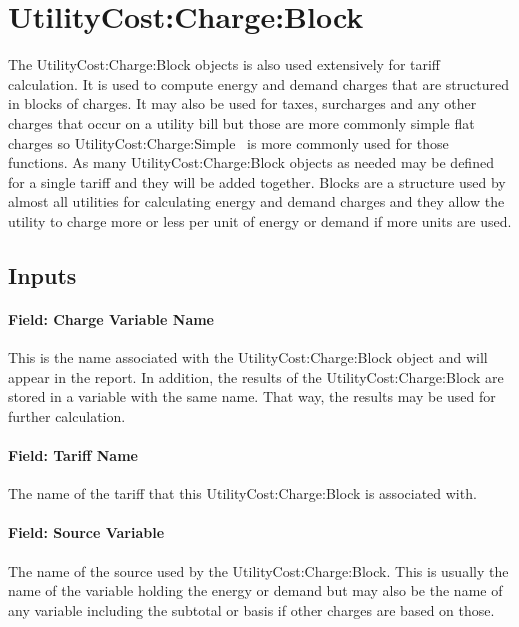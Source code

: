 \section{UtilityCost:Charge:Block}\label{utilitycostchargeblock}

The UtilityCost:Charge:Block objects is also used extensively for tariff calculation. It is used to compute energy and demand charges that are structured in blocks of charges. It may also be used for taxes, surcharges and any other charges that occur on a utility bill but those are more commonly simple flat charges so UtilityCost:Charge:Simple ~is more commonly used for those functions. As many UtilityCost:Charge:Block objects as needed may be defined for a single tariff and they will be added together. Blocks are a structure used by almost all utilities for calculating energy and demand charges and they allow the utility to charge more or less per unit of energy or demand if more units are used.

\subsection{Inputs}\label{inputs-067}

\paragraph{Field: Charge Variable Name}\label{field-charge-variable-name}

This is the name associated with the UtilityCost:Charge:Block object and will appear in the report. In addition, the results of the UtilityCost:Charge:Block are stored in a variable with the same name. That way, the results may be used for further calculation.

\paragraph{Field: Tariff Name}\label{field-tariff-name}

The name of the tariff that this UtilityCost:Charge:Block is associated with.

\paragraph{Field: Source Variable}\label{field-source-variable}

The name of the source used by the UtilityCost:Charge:Block. This is usually the name of the variable holding the energy or demand but may also be the name of any variable including the subtotal or basis if other charges are based on those.

